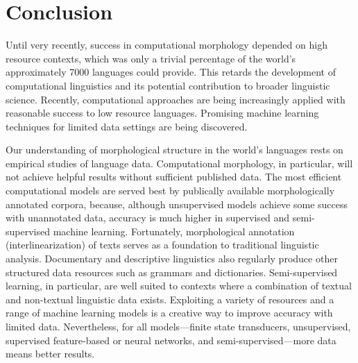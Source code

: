 \documentclass[12pt]{article}
\begin{document}
\section{Conclusion}

Until very recently, success in computational morphology depended on high resource contexts, which was only a trivial percentage of the world’s approximately 7000 languages could provide. This retards the development of computational linguistics and its potential contribution to broader linguistic science. Recently, computational approaches are being increasingly applied with reasonable success to low resource languages. Promising machine learning techniques for limited data settings are being discovered. 

Our understanding of morphological structure in the world's languages rests on empirical studies of language data. Computational morphology, in particular, will not achieve helpful results without sufficient published data. The most efficient computational models are served best by publically available morphologically annotated corpora, because, although unsupervised models achieve some success with unannotated data, accuracy is much higher in supervised and semi-supervised machine learning. Fortunately, morphological annotation (interlinearization) of texts serves as a foundation to traditional linguistic analysis. Documentary and descriptive linguistics also regularly produce other structured data resources such as grammars and dictionaries. Semi-supervised learning, in particular, are well suited to contexts where a combination of textual and non-textual linguistic data exists. Exploiting a variety of resources and a range of machine learning models is a creative way to improve accuracy with limited data. Nevertheless, for all models—finite state transducers, unsupervised, supervised feature-based or neural networks, and semi-supervised—more data means better results. 
\end{document}
